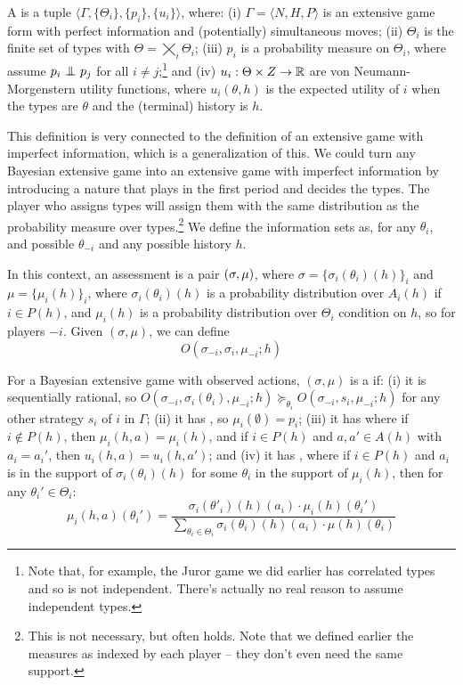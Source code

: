\documentclass[10pt]{article}
\begin{document}
\begin{definition}
	A  is a tuple $\langle \Gamma, \{\Theta_i\},\{p_i\},\{u_i\}\rangle$, where: (i) $\Gamma = \langle N,H,P\rangle$ is an extensive game form with perfect information and (potentially) simultaneous moves; (ii) $\Theta_i$ is the finite set of types with $\Theta = \bigtimes_i \Theta_i$; (iii) $p_i$ is a probability measure on $\Theta_i$, where assume $p_i \perp \hspace{-1.4ex} \perp p_j$ for all $i \ne j$;\footnote{Note that, for example, the Juror game we did earlier has correlated types and so is not independent. There's actually no real reason to assume independent types.} and (iv) $u_i: \Theta \times Z \to \mathbb{R}$ are von Neumann-Morgenstern utility functions, where $u_i(\theta,h)$ is the expected utility of $i$ when the types are $\theta$ and the (terminal) history is $h$.
\end{definition}

\begin{remark}
	This definition is very connected to the definition of an extensive game with imperfect information, which is a generalization of this. We could turn any Bayesian extensive game into an extensive game with imperfect information by introducing a nature that plays in the first period and decides the types. The player who assigns types will assign them with the same distribution as the probability measure over types.\footnote{This is not necessary, but often holds. Note that we defined earlier the measures as indexed by each player -- they don't even need the same support.} We define the information sets as, for any $\theta_i$, and possible $\theta_{-i}$ and any possible history $h$.
\end{remark}

In this context, an assessment is a pair $\left(\sigma,\mu\right)$, where $\sigma = \{\sigma_i(\theta_i)(h)\}_i$ and $\mu = \{\mu_i(h)\}_i$, where $\sigma_i(\theta_i)(h)$ is a probability distribution over $A_i(h)$ if $i \in P(h)$, and $\mu_i(h)$ is a probability distribution over $\Theta_i$ condition on $h$, so for players $-i$. Given $(\sigma,\mu)$, we can define \[O(\sigma_{-i},\sigma_i,\mu_{-i};h)\]

 \begin{definition}
 	For a Bayesian extensive game with observed actions, $(\sigma,\mu)$ is a  if: (i) it is sequentially rational, so $O(\sigma_{-i},\sigma_i(\theta_i),\mu_{-i};h) \succeq_{\theta_i}O(\sigma_{-i},s_i,\mu_{-i};h)$ for any other strategy $s_i$ of $i$ in $\Gamma$; (ii) it has , so $\mu_i(\emptyset) = p_i$; (iii) it has  where if $i \not\in P(h)$, then $\mu_i(h,a) = \mu_i(h)$, and if $i \in P(h)$ and $a,a'\in A(h)$ with $a_i = a_i'$, then $u_i(h,a) = u_i(h,a')$; and (iv) it has , where if $i \in P(h)$ and $a_i$ is in the support of $\sigma_i(\theta_i)(h)$ for some $\theta_i$ in the support of $\mu_i(h)$, then for any $\theta_i' \in \Theta_i$: \[\mu_i(h,a)(\theta_i') = \frac{\sigma_i(\theta'_i)(h)(a_i) \cdot \mu_i(h)(\theta_i')}{\sum_{\theta_i\in \Theta_i} \sigma_i(\theta_i)(h)(a_i) \cdot \mu (h)(\theta_i)}\]
 \end{definition}
\end{document}

